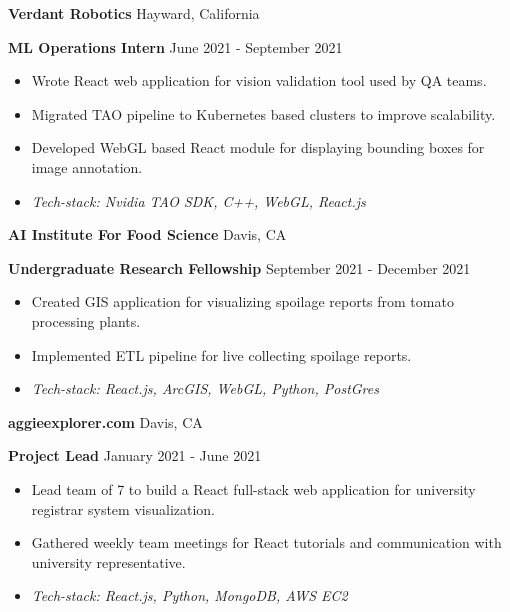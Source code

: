 \documentclass[11pt]{article}
\begin{document}
\vspace{8pt}

\textbf{Verdant Robotics} \hfill Hayward, California

\textbf{ML Operations Intern} \hfill June 2021 - September 2021 
\begin{itemize}[noitemsep, topsep=0pt, partopsep=0pt, parsep=0pt]
    \item Wrote React web application for vision validation tool used by QA teams.
    \item Migrated TAO pipeline to Kubernetes based clusters to improve scalability.
    \item Developed WebGL based React module for displaying bounding boxes for image annotation.
    \item \textit{Tech-stack: Nvidia TAO SDK, C++, WebGL, React.js}
\end{itemize}

\vspace{8pt}

\textbf{AI Institute For Food Science}	\hfill Davis, CA

\textbf{Undergraduate Research Fellowship} \hfill September 2021 - December 2021
\begin{itemize}[noitemsep, topsep=0pt, partopsep=0pt, parsep=0pt]
    \item Created GIS application for visualizing spoilage reports from tomato processing plants.
    \item Implemented ETL pipeline for live collecting spoilage reports.
    \item \textit{Tech-stack: React.js, ArcGIS, WebGL, Python, PostGres}
\end{itemize}

\vspace{8pt}

\textbf{aggieexplorer.com} \hfill Davis, CA

\textbf{Project Lead} \hfill January 2021 - June 2021
\begin{itemize}[noitemsep, topsep=0pt, partopsep=0pt, parsep=0pt]
    \item Lead team of 7 to build a React full-stack web application for university registrar system visualization.
    \item Gathered weekly team meetings for React tutorials and communication with university representative.
    \item \textit{Tech-stack: React.js, Python, MongoDB, AWS EC2}
\end{itemize}
\end{document}
